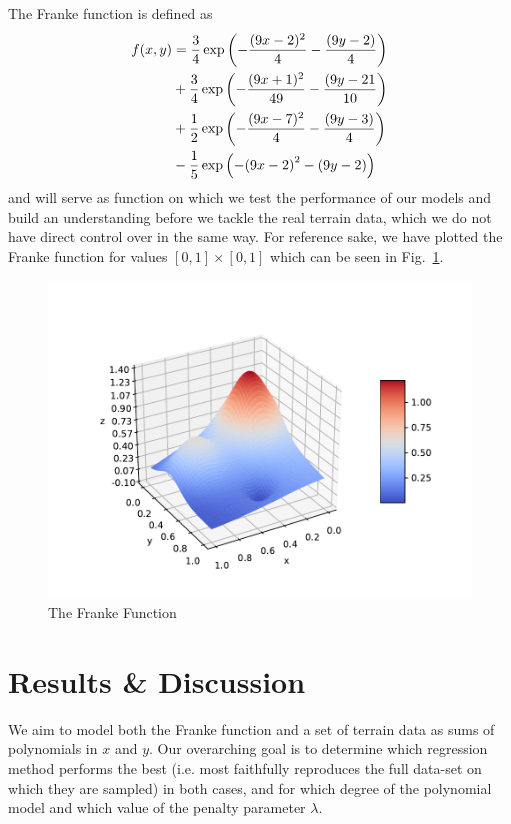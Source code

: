 \documentclass[reprint, english, nofootinbib]{revtex4-2}
\begin{document}
        The Franke function is defined as
        \begin{align}
        \label{eq:franke}
            \begin{split}
                f(x, y)
                &= \frac{3}{4}\exp\qty(-\frac{(9x - 2)^2}{4} - \frac{(9y - 2)}{4})      \\
                &+ \frac{3}{4}\exp\qty(-\frac{(9x + 1)^2}{49} - \frac{(9y - 21}{10})    \\
                &+ \frac{1}{2}\exp\qty(-\frac{(9x - 7)^2}{4} - \frac{(9y - 3)}{4})      \\
                &- \frac{1}{5}\exp\qty(-\qty(9x - 2)^2 - \qty(9y - 2))
            \end{split}
        \end{align}
        and will serve as function on which we test the performance of our models and build an understanding before we tackle the real terrain data, which we do not have direct control over in the same way. For reference sake, we have plotted the Franke function for values $[0, 1]\times[0,1]$ which can be seen in Fig.~\ref{fig:FrankeFunction}.
        \begin{figure}[h!tb]
            \center
            \includegraphics[width=\columnwidth]{frankefunc_plot.pdf}
            \caption{\label{fig:FrankeFunction}The Franke Function}
        \end{figure}

\section{Results \& Discussion}
\noindent
We aim to model both the Franke function and a set of terrain data as sums of polynomials in $x$ and $y$. Our overarching goal is to determine which regression method performs the best (i.e. most faithfully reproduces the full data-set on which they are sampled) in both cases, and for which degree of the polynomial model and which value of the penalty parameter $\lambda$.
\end{document}
